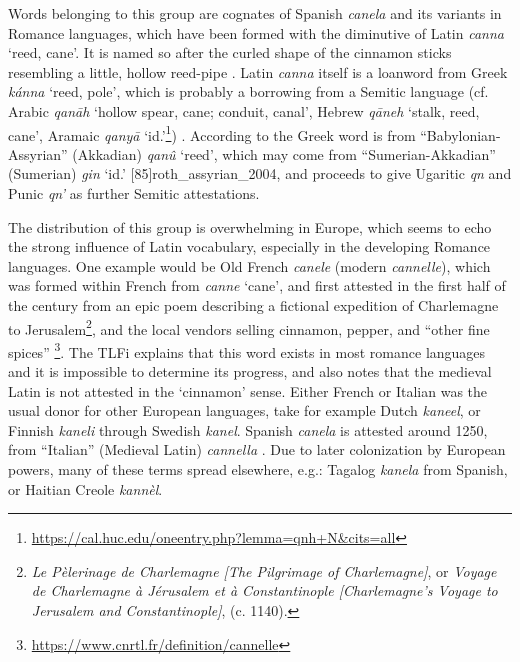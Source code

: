 Words belonging to this group are cognates of Spanish \textit{canela} and its variants in Romance languages, which have been formed with the diminutive of Latin \textit{canna} `reed, cane'. It is named so after the curled shape of the cinnamon sticks resembling a little, hollow reed-pipe . Latin \textit{canna} itself is a loanword from Greek 
\textit{kánna} `reed, pole', which is probably a borrowing from a Semitic language (cf. Arabic 
\textit{qan\={a}h} `hollow spear, cane; conduit, canal', Hebrew 
\textit{qāneh} `stalk, reed, cane', Aramaic  
\textit{qanyā} `id.'\footnote{\url{https://cal.huc.edu/oneentry.php?lemma=qnh+N&cits=all}}) . According to \textcite[636]{beekes_etymological_2010} the Greek word is from ``Babylonian-Assyrian'' (Akkadian) \cu{\GA\NU\UU\UM} \textit{qanû} `reed', which may come from ``Sumerian-Akkadian'' (Sumerian) \cu{\GI} \textit{gin} `id.' [85]{roth_assyrian_2004}, and proceeds to give Ugaritic \textit{qn} and Punic \textit{qn'} as further Semitic attestations.

The distribution of this group is overwhelming in Europe, which seems to echo the strong influence of Latin vocabulary, especially in the developing Romance languages. One example would be Old French \textit{canele} (modern \textit{cannelle}), which was formed within French from \textit{canne} `cane', and first attested in the first half of the  century from an epic poem describing a fictional expedition of Charlemagne to Jerusalem\footnote{\textit{Le Pèlerinage de Charlemagne [The Pilgrimage of Charlemagne]}, or \textit{Voyage de Charlemagne à Jérusalem et à Constantinople [Charlemagne's Voyage to Jerusalem and Constantinople]}, (c. 1140).}, and the local vendors selling cinnamon, pepper, and ``other fine spices'' \footnote{\url{https://www.cnrtl.fr/definition/cannelle}}. The \gls{TLFi} explains that this word exists in most romance languages and it is impossible to determine its progress, and also notes that the medieval Latin is not attested in the `cinnamon' sense. Either French or Italian was the usual donor for other European languages, take for example Dutch \textit{kaneel}, or Finnish \textit{kaneli} through Swedish \textit{kanel}. Spanish \textit{canela} is attested around 1250, from ``Italian'' (Medieval Latin) \textit{cannella} \autocites[125]{corominas_breve_1987}[98]{gomez_de_silva_elseviers_1985}. Due to later colonization by European powers, many of these terms spread elsewhere, e.g.: Tagalog \textit{kanela} from Spanish, or Haitian Creole \textit{kannèl}.

